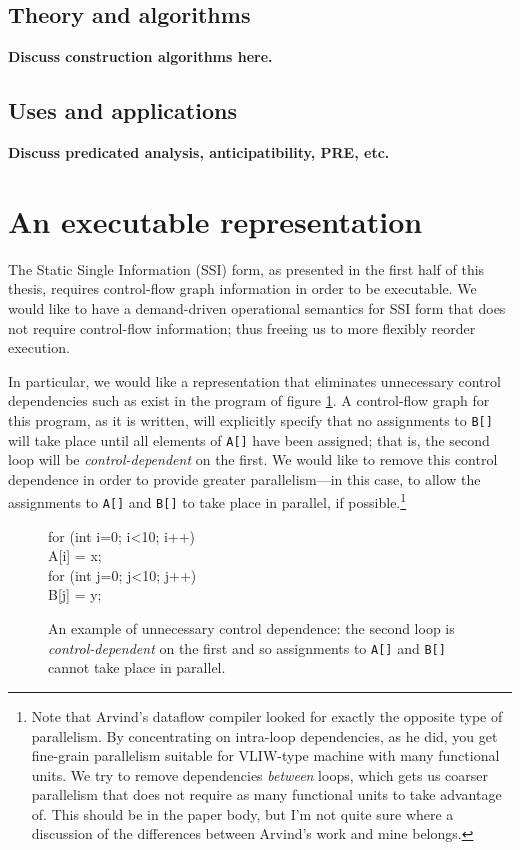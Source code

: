 \documentclass[12pt,notitlepage,twoside]{article}
\begin{document}
\subsection{Theory and algorithms}
\textbf{Discuss construction algorithms here.}

\subsection{Uses and applications}
\textbf{Discuss predicated analysis, anticipatibility, PRE, etc.}

\section{An executable representation}
The Static Single Information (SSI) form, as presented in the first
half of this thesis,
requires control-flow graph information in order to be executable. We
would like to have a demand-driven operational semantics for SSI form
that does not require control-flow information; thus freeing us to
more flexibly reorder execution.

In particular, we would like a representation that eliminates
unnecessary control dependencies such as exist in the program of
figure \ref{fig:ctrldep}.  A control-flow graph for this program, as
it is written, will explicitly specify that no assignments to
\texttt{B[]} will take place until all elements of \texttt{A[]} have
been assigned; that is, the second loop will be
\emph{control-dependent} on the first.  We would like to remove this
control dependence in order to provide greater parallelism---in this
case, to allow the assignments to \texttt{A[]} and \texttt{B[]} to
take place in parallel, if possible.\footnote{Note that Arvind's
dataflow compiler looked for exactly the opposite type of
parallelism.  By concentrating on intra-loop dependencies, as he did, you get
fine-grain parallelism suitable for VLIW-type machine with many
functional units.  We try to remove dependencies \emph{between} loops,
which gets us coarser parallelism that does not require as many
functional units to take advantage of.  This should be in the paper
body, but I'm not quite sure where a discussion of the differences
between Arvind's work and mine belongs.}

\begin{figure}[t]
\begin{samplecode}
for (int i=0; i<10; i++)\\
\>A[i] = x;\\
for (int j=0; j<10; j++)\\
\>B[j] = y;\\
\end{samplecode}
\caption{An example of unnecessary control dependence: the second loop
is \emph{control-dependent} on the first and so assignments to
\texttt{A[]} and \texttt{B[]} cannot take place in parallel.}
\label{fig:ctrldep}
\end{figure}
\end{document}
